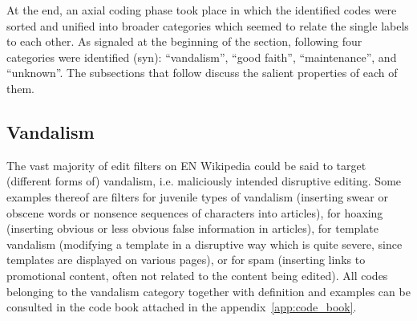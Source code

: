 At the end, an axial coding phase took place in which the identified codes were sorted and unified into broader categories which seemed to relate the single labels to each other.
As signaled at the beginning of the section, following four categories were identified (syn): ``vandalism'', ``good faith'', ``maintenance'', and ``unknown''.
The subsections that follow discuss the salient properties of each of them.

\subsection{Vandalism}

The vast majority of edit filters on EN Wikipedia could be said to target (different forms of) vandalism, i.e. maliciously intended disruptive editing.
Some examples thereof are filters for juvenile types of vandalism (inserting swear or obscene words or nonsence sequences of characters into articles), for hoaxing (inserting obvious or less obvious false information in articles), for template vandalism (modifying a template in a disruptive way which is quite severe, since templates are displayed on various pages), or for spam (inserting links to promotional content, often not related to the content being edited). %
All codes belonging to the vandalism category together with definition and examples can be consulted in the code book attached in the appendix~\ref{app:code_book}.

